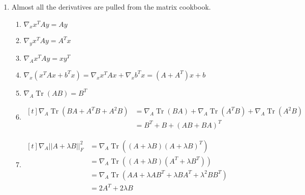 \documentclass[12pt]{article}
\DeclareMathOperator{\Tr}{Tr}
\begin{document}
\begin{enumerate}
            \pagebreak

      \item Almost all the derivatives are pulled from the matrix cookbook.
            \begin{enumerate}
                  \item $\nabla_x x^T A y = A y$
                  \item $\nabla_y x^T A y = A^T x$
                  \item $\nabla_A x^T A y = xy^T$
                  \item $\nabla_x \left(x^T A x + b^T x\right)= \nabla_x x^T A x + \nabla_x b^T x = \boxed{\left(A+A^T\right)x+b}$
                  \item $\nabla_A \Tr(AB)=B^T$
                  \item $\begin{aligned}[t]
                                    \nabla_A \Tr\left(BA+A^TB+A^2B\right)
                                     & = \nabla_A \Tr(BA)+\nabla_A \Tr\left(A^TB\right)+\nabla_A \Tr\left(A^2B\right) \\
                                     & = \boxed{B^T + B + (AB+BA)^T}
                              \end{aligned}$
                  \item $\begin{aligned}[t]
                                    \nabla_A ||A+\lambda B||^2_F
                                     & = \nabla_A \Tr\left((A+\lambda B)(A+\lambda B)^T\right)                       \\
                                     & = \nabla_A \Tr\left((A+\lambda B)\left(A^T+\lambda B^T\right)\right)          \\
                                     & = \nabla_A \Tr\left(AA+\lambda A B^T + \lambda B A^T + \lambda^2 B B^T\right) \\
                                     & = \boxed{2A^T+2\lambda B}
                              \end{aligned}$
            \end{enumerate}


\end{enumerate}
\end{document}

